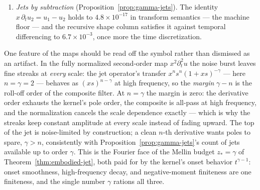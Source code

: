 \begin{example}
\begin{enumerate}
event never increase at any scale where the past-dominating condition holds ($0$
violations; the condition holds at $15$ and $63$ of the $64$ scales respectively). The
wake companion realizes the corollary's sharp failure mode: its maximum decays to
$0.0423$ by $x = 35$, is then lifted $8\%$ to $0.0456$ by the strong event's arriving
delayed mass --- the echo --- and annihilates near $x = 49$ (the inset of
Figure~\ref{fig:experiment}).
\item \emph{Jets by subtraction} (Proposition~\ref{prop:gamma-jets}). The identity
$x\,\partial_t u_2 = u_1 - u_2$ holds to $4.8 \times 10^{-17}$ in transform semantics ---
the machine floor --- and the recursive shape column satisfies it against temporal
differencing to $6.7 \times 10^{-3}$, once more the time discretization.
\end{enumerate}

One feature of the maps should be read off the symbol rather than dismissed as an
artifact. In the fully normalized second-order map $x^2 \partial_t^2 u$ the noise burst
leaves fine streaks at \emph{every} scale: the jet operator's transfer
$x^n s^n (1 + xs)^{-\gamma}$ --- here $n = \gamma = 2$ --- behaves as
$(xs)^{n - \gamma}$ at high frequency, so the \emph{margin} $\gamma - n$ is the
roll-off order of the composite filter. At $n = \gamma$ the margin is zero: the
derivative order exhausts the kernel's pole order, the composite is all-pass at high
frequency, and the normalization cancels the scale dependence exactly --- which is why
the streaks keep constant amplitude at every scale instead of fading upward. The top of
the jet is noise-limited by construction; a clean $n$-th
derivative wants poles to spare, $\gamma > n$, consistently with
Proposition~\ref{prop:gamma-jets}'s count of jets available up to order $\gamma$. This
is the Fourier face of the Mellin budget $z_* = \gamma$ of
Theorem~\ref{thm:embodied-jet}, both paid for by the kernel's onset behavior
$t^{\gamma - 1}$: onset smoothness, high-frequency decay, and negative-moment
finiteness are one finiteness, and the single number $\gamma$ rations all three.
\end{example}
